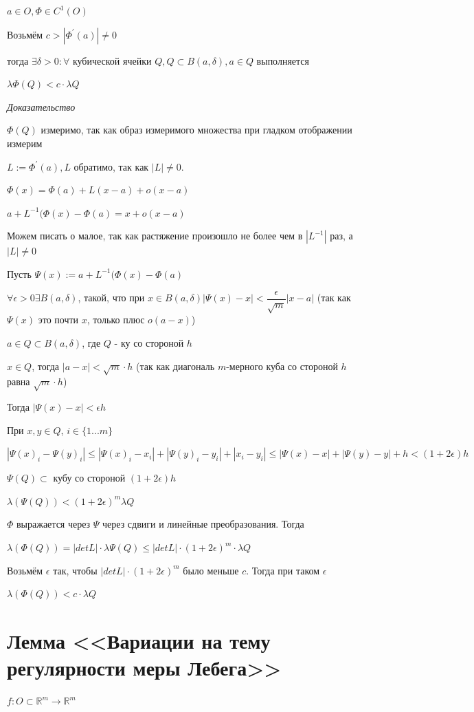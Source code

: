 \documentclass[paper=a4, fontsize=17pt]{article}
\begin{document}
$a \in O, \Phi \in C^1(O)$

Возьмём $c > |\Phi^{'}(a)| \neq 0$

тогда $\exists \delta > 0: \forall$ кубической ячейки $Q, Q \subset B(a, \delta), a \in Q$ выполняется

$\lambda \Phi(Q) < c \cdot \lambda Q$

\emph{Доказательство}

$\Phi(Q)$ измеримо, так как образ измеримого множества при гладком отображении измерим

$L := \Phi^{'}(a), L$ обратимо, так как $|L| \neq 0$.

$\Phi(x) = \Phi(a) + L(x - a) + o(x - a)$

$a + L^{-1} (\Phi(x) - \Phi(a) = x + o(x - a)$

Можем писать о малое, так как растяжение произошло не более чем в $|L^{-1}|$ раз, а $|L| \neq 0$

Пусть $\Psi(x) := a + L^{-1} (\Phi(x) - \Phi(a)$

$\forall \epsilon > 0 \exists B(a, \delta)$, такой, что при $x \in B(a, \delta) |\Psi(x) - x| < \dfrac{\epsilon}{\sqrt{m}} |x - a|$ (так как $\Psi(x)$ это почти $x$, только плюс $o(a - x)$)

$a \in Q \subset B(a, \delta)$, где $Q$ - ку со стороной $h$

$x \in Q$, тогда $|a - x| < \sqrt{m} \cdot h$ (так как диагональ $m$-мерного куба со стороной $h$ равна $\sqrt{m} \cdot h$)

Тогда $|\Psi(x) - x| < \epsilon h$

При $x, y \in Q$, $i \in \{1...m\}$

$|\Psi(x)_i - \Psi(y)_i| \leqslant |\Psi(x)_i - x_i| + |\Psi(y)_i - y_i| + |x_i - y_i| \leqslant |\Psi(x) - x| + |\Psi(y) - y| + h < (1 + 2 \epsilon)h$

$\Psi(Q) \subset$ кубу со стороной $(1 + 2 \epsilon) h$

$\lambda(\Psi(Q)) < (1 + 2 \epsilon)^m \lambda Q$

$\Phi$ выражается через $\Psi$ через сдвиги и линейные преобразования. Тогда

$\lambda(\Phi(Q)) = |det L| \cdot \lambda \Psi(Q) \leqslant |det L| \cdot (1 + 2 \epsilon)^m \cdot \lambda Q$

Возьмём $\epsilon$ так, чтобы $|det L| \cdot (1 + 2 \epsilon)^m$ было меньше $c$. Тогда при таком $\epsilon$  

$\lambda(\Phi(Q)) < c \cdot \lambda Q$

\section{Лемма <<Вариации на тему регулярности меры Лебега>>}
$f: O \subset \mathds{R}^m \rightarrow \mathds{R}^m$
\end{document}
